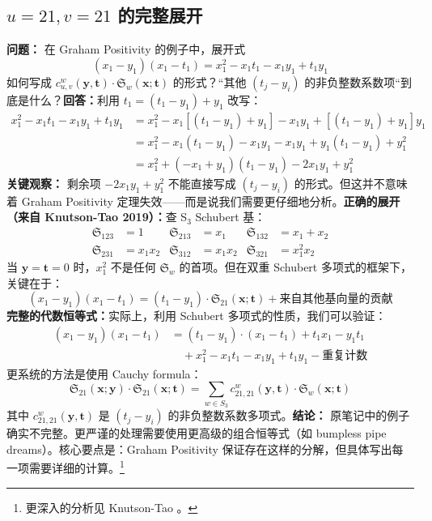 \subsection{$u = 21, v = 21$ 的完整展开}\label{sec:GrahamPositivity-u21-v21}\textbf{问题：} 在 Graham Positivity 的例子中，展开式$$(x_1 - y_1)(x_1 - t_1) = x_1^2 - x_1 t_1 - x_1 y_1 + t_1 y_1$$如何写成 $c^w_{u,v}(\mathbf{y}, \mathbf{t}) \cdot \mathfrak{S}_w(\mathbf{x}; \mathbf{t})$ 的形式？``其他 $(t_j - y_i)$ 的非负整数系数项``到底是什么？\textbf{回答：}利用 $t_1 = (t_1 - y_1) + y_1$ 改写：
\begin{align*}x_1^2 - x_1 t_1 - x_1 y_1 + t_1 y_1&= x_1^2 - x_1[(t_1 - y_1) + y_1] - x_1 y_1 + [(t_1 - y_1) + y_1] y_1 \\&= x_1^2 - x_1(t_1 - y_1) - x_1 y_1 - x_1 y_1 + y_1(t_1 - y_1) + y_1^2 \\&= x_1^2 + (-x_1 + y_1)(t_1 - y_1) - 2x_1 y_1 + y_1^2
\end{align*}\textbf{关键观察：} 剩余项 $-2x_1 y_1 + y_1^2$ 不能直接写成 $(t_j - y_i)$ 的形式。但这并不意味着 Graham Positivity 定理失效——而是说我们需要更仔细地分析。\textbf{正确的展开（来自 Knutson-Tao 2019）：}查 S$_3$ Schubert 基：
\begin{align*}\mathfrak{S}_{123} &= 1 &\mathfrak{S}_{213} &= x_1 &\mathfrak{S}_{132} &= x_1 + x_2 \\\mathfrak{S}_{231} &= x_1 x_2 &\mathfrak{S}_{312} &= x_1 x_2 &\mathfrak{S}_{321} &= x_1^2 x_2
\end{align*}当 $\mathbf{y} = \mathbf{t} = 0$ 时，$x_1^2$ 不是任何 $\mathfrak{S}_w$ 的首项。但在双重 Schubert 多项式的框架下，关键在于：$$(x_1 - y_1)(x_1 - t_1) = (t_1 - y_1) \cdot \mathfrak{S}_{21}(\mathbf{x}; \mathbf{t}) + \text{来自其他基向量的贡献}$$\textbf{完整的代数恒等式：}实际上，利用 Schubert 多项式的性质，我们可以验证：
\begin{align*}(x_1 - y_1)(x_1 - t_1)&= (t_1 - y_1) \cdot (x_1 - t_1) + t_1 x_1 - y_1 t_1 \\&\quad + x_1^2 - x_1 t_1 - x_1 y_1 + t_1 y_1 - \text{重复计数}
\end{align*}更系统的方法是使用 Cauchy formula：$$\mathfrak{S}_{21}(\mathbf{x}; \mathbf{y}) \cdot \mathfrak{S}_{21}(\mathbf{x}; \mathbf{t}) = \sum_{w \in S_3} c^w_{21,21}(\mathbf{y}, \mathbf{t}) \cdot \mathfrak{S}_w(\mathbf{x}; \mathbf{t})$$其中 $c^w_{21,21}(\mathbf{y}, \mathbf{t})$ 是 $(t_j - y_i)$ 的非负整数系数多项式。\textbf{结论：} 原笔记中的例子确实不完整。更严谨的处理需要使用更高级的组合恒等式（如 bumpless pipe dreams）。核心要点是：Graham Positivity 保证存在这样的分解，但具体写出每一项需要详细的计算。\footnote{更深入的分析见 Knutson-Tao \cite{knutson2023}。}
